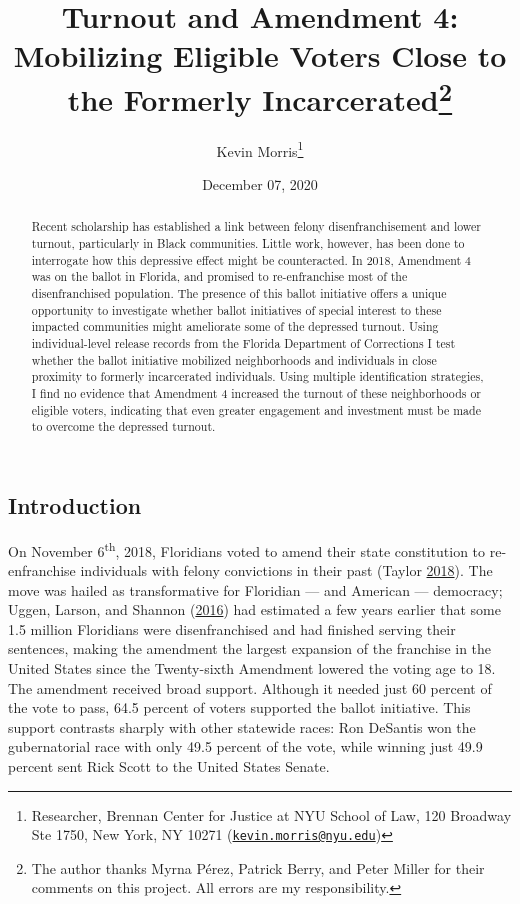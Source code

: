 \documentclass[
  12pt,
]{article}
\title{Turnout and Amendment 4: Mobilizing Eligible Voters Close to the Formerly Incarcerated\thanks{The author thanks Myrna Pérez, Patrick Berry, and Peter Miller for their comments on this project. All errors are my responsibility.}}
\author{Kevin Morris\footnote{Researcher, Brennan Center for Justice at NYU School of Law, 120 Broadway Ste 1750, New York, NY 10271 (\href{mailto:kevin.morris@nyu.edu}{\nolinkurl{kevin.morris@nyu.edu}})}}
\date{December 07, 2020}
\begin{document}
\maketitle
\begin{abstract}
Recent scholarship has established a link between felony disenfranchisement and lower turnout, particularly in Black communities. Little work, however, has been done to interrogate how this depressive effect might be counteracted. In 2018, Amendment 4 was on the ballot in Florida, and promised to re-enfranchise most of the disenfranchised population. The presence of this ballot initiative offers a unique opportunity to investigate whether ballot initiatives of special interest to these impacted communities might ameliorate some of the depressed turnout. Using individual-level release records from the Florida Department of Corrections I test whether the ballot initiative mobilized neighborhoods and individuals in close proximity to formerly incarcerated individuals. Using multiple identification strategies, I find no evidence that Amendment 4 increased the turnout of these neighborhoods or eligible voters, indicating that even greater engagement and investment must be made to overcome the depressed turnout.
\end{abstract}

\pagebreak

\doublespacing

\hypertarget{introduction}{%
\subsection*{Introduction}\label{introduction}}

On November 6\textsuperscript{th}, 2018, Floridians voted to amend their state constitution to re-enfranchise individuals with felony convictions in their past (Taylor \protect\hyperlink{ref-Taylor2018}{2018}). The move was hailed as transformative for Floridian --- and American --- democracy; Uggen, Larson, and Shannon (\protect\hyperlink{ref-sentencing_2016}{2016}) had estimated a few years earlier that some 1.5 million Floridians were disenfranchised and had finished serving their sentences, making the amendment the largest expansion of the franchise in the United States since the Twenty-sixth Amendment lowered the voting age to 18. The amendment received broad support. Although it needed just 60 percent of the vote to pass, 64.5 percent of voters supported the ballot initiative. This support contrasts sharply with other statewide races: Ron DeSantis won the gubernatorial race with only 49.5 percent of the vote, while winning just 49.9 percent sent Rick Scott to the United States Senate.
\end{document}
